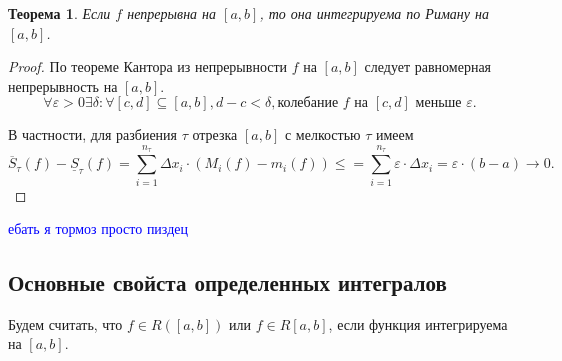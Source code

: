 \documentclass{article}
\theoremstyle{plain}
\newtheorem{theorem}{Теорема}
\theoremstyle{definition}
\theoremstyle{remark}
\renewcommand{\*}{\cdot}
\begin{document}
\begin{theorem}
Если $f$ непрерывна на $[a,b]$, то она интегрируема по Риману на $[a,b]$.
\end{theorem}
\begin{proof}
По теореме Кантора из непрерывности $f$ на $[a,b]$ следует равномерная непрерывность на $[a,b]$.
\[
\forall \varepsilon > 0 \exists \delta: \forall [c, d] \subseteq [a, b], d-c < \delta, \text{колебание } f\text{ на } [c, d] \text{ меньше } \varepsilon.\]

В частности, для разбиения $\tau$ отрезка $[a, b]$ с мелкостью $\tau$ имеем
\[
\overline{S}_{\tau}(f) - \underline{S}_{\tau}(f) = \sum_{i = 1}^{n_{\tau}}\Delta x_i \cdot (M_i(f) - m_i(f)) \leq = \sum_{i = 1}^{n_{\tau}}\varepsilon\cdot \Delta x_i = \varepsilon\cdot (b-a) \to 0.
\]
\end{proof}
\textcolor{blue}{ебать я тормоз просто пиздец}
\subsection{Основные свойста определенных интегралов}
Будем считать, что $f \in R([a, b])$ или $f \in R[a, b]$, если функция интегрируема на $[a, b]$.\\
\end{document}
